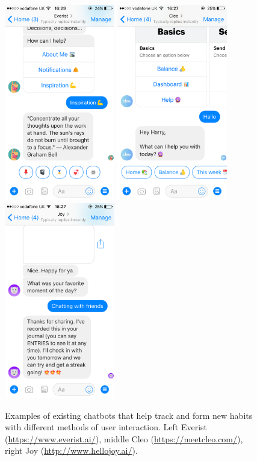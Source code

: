 \begin{figure}[H]
  \centering
  \includegraphics[width=1.9in]{../resources/existing-bots/everist.png}
  \hspace{10px}
  \includegraphics[width=1.9in]{../resources/existing-bots/cleo.png}
  \hspace{10px}
  \includegraphics[width=1.9in]{../resources/existing-bots/joy-ai.png}
  \caption{Examples of existing chatbots that help track and form new habits with different methods of user interaction. Left Everist (\url{https://www.everist.ai/}), middle Cleo (\url{https://meetcleo.com/}), right Joy (\url{http://www.hellojoy.ai/}).}
  \label{fig:chatbots_examples}
\end{figure}


